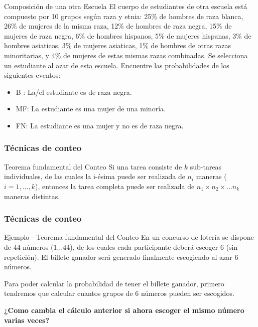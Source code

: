 \documentclass[table]{beamer}
\begin{document}
\begin{frame}
	 \begin{block}{Composición de una otra Escuela}
		El cuerpo de estudiantes de otra escuela está compuesto por 10 grupos según raza y etnia: 25\% de hombres de raza blanca, 26\% de mujeres de la misma raza, 12\% de hombres de raza negra, 15\% de mujeres de raza negra, 6\% de hombres hispanos, 5\% de mujeres hispanas, 3\% de hombres asiaticos, 3\% de mujeres asiaticas, 1\% de hombres de otras razas minoritarias, y 4\% de mujeres de estas mismas razas combinadas.
Se selecciona un estudiante al azar de esta escuela.
Encuentre las probabilidades de los siguientes eventos:
	\begin{itemize}
		\item B : La/el estudiante es de raza negra.
		\item MF: La estudiante es una mujer de una minoría.
		\item FN: La estudiante es una mujer y no es de raza negra.
	\end{itemize}

    \end{block}
\end{frame}


\begin{frame}
    \frametitle{Técnicas de conteo}

	\begin{block}{Teorema fundamental del Conteo}
		Si una tarea consiste de $k$ sub-tareas individuales, de las cuales la i-ésima puede ser realizada de $n_i$ maneras ($i= 1,\ldots ,k$), entonces la tarea completa puede ser realizada  de $n_1\times n_2\times \ldots n_k$ maneras distintas. 
	\end{block}
	
\end{frame}



\begin{frame}
    \frametitle{Técnicas de conteo}

	\begin{block}{Ejemplo - Teorema fundamental del Conteo}
		En un concurso de lotería se dispone de 44 números ($1\ldots 44$), de los cuales cada participante deberá escoger $6$ (sin repetición). El billete ganador será generado finalmente escogiendo al azar 6 números.

	Para poder calcular la probabilidad de tener el billete ganador, primero tendremos que calcular cuantos grupos de 6 números pueden ser escogidos.
		
	\end{block}
	\pause
\textbf{¿Como cambia el cálculo anterior si ahora escoger el mismo número varias veces?}

\end{frame}
\end{document}

